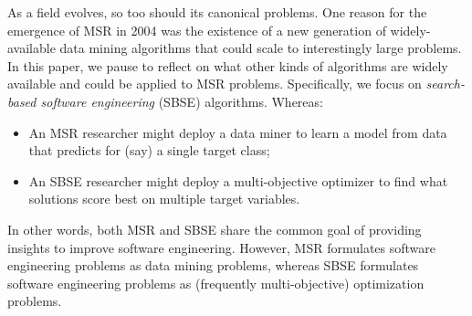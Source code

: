 \documentclass[sigconf,anonymous,review]{acmart}
\begin{document}
As a field evolves, so too should its canonical problems. One  reason for the emergence of   MSR  in 2004 was the existence of a new generation of widely-available data mining
algorithms that could scale to interestingly large problems. In this paper,
we pause to reflect on what other kinds of algorithms are widely available and could
be applied to MSR problems.  Specifically, we focus on
{\em search-based software engineering} (SBSE) algorithms. Whereas:
\begin{itemize}[leftmargin=*]
\item
An MSR researcher might deploy a
data miner to learn a model from  data   that predicts for (say) a single target class;
\item
An SBSE researcher might deploy a multi-objective optimizer
to find what {solutions} score best
on multiple target variables.
\end{itemize}

{In other words, both MSR and SBSE share the common goal of providing insights to improve software engineering. However, MSR formulates software engineering problems as data mining problems, whereas SBSE formulates software engineering problems as (frequently multi-objective) optimization problems.}



 
\end{document}
